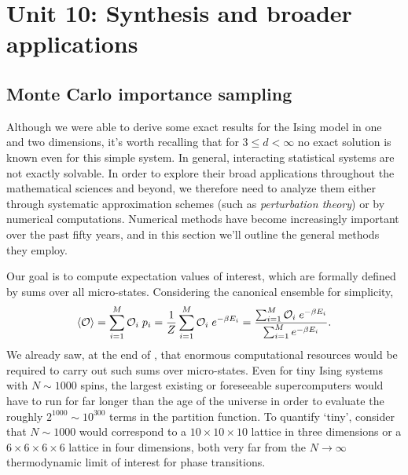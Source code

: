 \renewcommand{\thisunit}{MATH327 Unit 10}
\renewcommand{\moddate}{Last modified 13 May 2022}
\setcounter{section}{10}
\setcounter{subsection}{0}
{}
\section*{Unit 10: Synthesis and broader applications} %
\subsection{\label{sec:MonteCarlo}Monte Carlo importance sampling}
Although we were able to derive some exact results for the Ising model in one and two dimensions, it's worth recalling that for $3 \leq d < \infty$ no exact solution is known even for this simple system.
In general, interacting statistical systems are not exactly solvable.
In order to explore their broad applications throughout the mathematical sciences and beyond, we therefore need to analyze them either through systematic approximation schemes (such as \emph{perturbation theory}) or by numerical computations.
Numerical methods have become increasingly important over the past fifty years, and in this section we'll outline the general methods they employ.

Our goal is to compute expectation values of interest, which are formally defined by sums over all micro-states.
Considering the canonical ensemble for simplicity,
\begin{equation*}
  \left\langle \mathcal O \right\rangle = \sum_{i = 1}^M \mathcal O_i \; p_i = \frac{1}{Z} \sum_{i = 1}^M \mathcal O_i \; e^{-\beta E_i} = \frac{\sum_{i = 1}^M \mathcal O_i \; e^{-\beta E_i}}{\sum_{i = 1}^M e^{-\beta E_i}}.
\end{equation*}
We already saw, at the end of , that enormous computational resources would be required to carry out such sums over micro-states.
Even for tiny Ising systems with $N \sim 1000$ spins, the largest existing or foreseeable supercomputers would have to run for far longer than the age of the universe in order to evaluate the roughly $2^{1000} \sim 10^{300}$ terms in the partition function.
To quantify `tiny', consider that $N \sim 1000$ would correspond to a $10\times 10\times 10$ lattice in three dimensions or a $6\times 6\times 6\times 6$ lattice in four dimensions, both very far from the $N \to \infty$ thermodynamic limit of interest for phase transitions.

